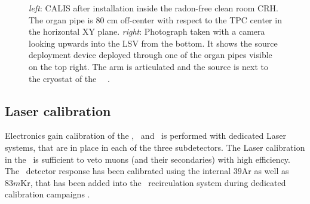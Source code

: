 \begin{figure}[htbp]
 \centering
{}
\caption{\textit{left}: CALIS after installation inside the radon-free clean room CRH. The organ pipe is 80 cm off-center with respect to the TPC center in the horizontal XY plane. \textit{right}: Photograph taken with a camera looking upwards into the LSV from the bottom. It shows the source deployment device deployed through one of the organ pipes visible on the top right. The arm is articulated and the source is next to the cryostat of the \lar\ \tpc\ \cite{Agnes:2015qyz}.
\label{fig:CALIS_photos}}
\end{figure}

\subsection*{Laser calibration}
Electronics gain calibration of the \wcv, \lsv\ and \tpc\ is performed with dedicated Laser systems, that are in place in each of the three subdetectors. The Laser calibration in the \wcv\ is sufficient to veto muons (and their secondaries) with high efficiency. The \tpc\ detector response has been calibrated using the internal ${39}$Ar as well as $83m$Kr, that has been added into the \lar\ recirculation system during dedicated calibration campaigns \cite{Agnes:2015gu}.







